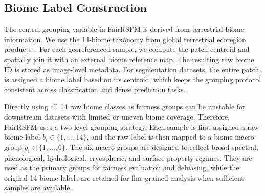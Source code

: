\documentclass[10pt,twocolumn,letterpaper]{article}
\newcommand{\method}{FairRSFM\xspace}
\begin{document}
\subsection{Biome Label Construction}
The central grouping variable in \method is derived from terrestrial biome information. We use the 14-biome taxonomy from global terrestrial ecoregion products~\cite{terrestrialecoregions,ecoregions2017}. For each georeferenced sample, we compute the patch centroid and spatially join it with an external biome reference map. The resulting raw biome ID is stored as image-level metadata. For segmentation datasets, the entire patch is assigned a biome label based on its centroid, which keeps the grouping protocol consistent across classification and dense prediction tasks.

Directly using all 14 raw biome classes as fairness groups can be unstable for downstream datasets with limited or uneven biome coverage. Therefore, \method uses a two-level grouping strategy. Each sample is first assigned a raw biome label \(b_i\in\{1,\ldots,14\}\), and the raw label is then mapped to a biome macro-group \(g_i\in\{1,\ldots,6\}\). The six macro-groups are designed to reflect broad spectral, phenological, hydrological, cryospheric, and surface-property regimes. They are used as the primary groups for fairness evaluation and debiasing, while the original 14 biome labels are retained for fine-grained analysis when sufficient samples are available.



\end{document}
